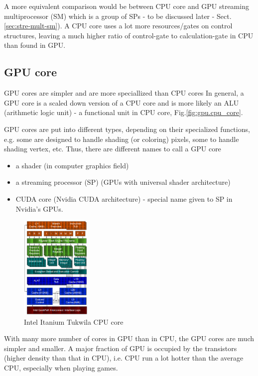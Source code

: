 A more equivalent comparison would be between CPU core and GPU streaming
multiprocessor (SM) which is a group of SPs - to be discussed later -
Sect.\ref{sec:stre-mult-sm}). A CPU core uses a lot more resources/gates on
control structures, leaving a much higher ratio of control-gate to
calculation-gate in CPU than found in GPU.

\subsection{GPU core}

GPU cores are simpler and are more speciallized than CPU cores
In general, a GPU core is a scaled down version of a CPU core and is more likely
an ALU (arithmetic logic unit) - a functional unit in CPU core,
Fig.\ref{fig:gpu.cpu_core}. 

GPU cores are put into different types, depending on their specialized
functions, e.g. some are designed to handle shading (or coloring) pixels, some
to handle shading vertex, etc. Thus, there are different names to call a GPU
core
\begin{itemize}
  \item a shader (in computer graphics field) 
  
  \item a streaming processor (SP) (GPUs with universal shader architecture)
  
  \item CUDA core (Nvidia CUDA architecture) - special name given to SP in Nvidia's GPUs.
\end{itemize}

\begin{figure}[hbt]
  \centerline{\includegraphics[height=5cm,
    angle=0]{./images/Intel_Itanium_Tukwila_core.eps}}
  \caption{Intel Itanium Tukwila CPU core}
  \label{fig:Intel_Itanium_Tukwila_core}
\end{figure}

With many more number of cores in GPU than in CPU, the GPU cores are much
simpler and smaller. A major fraction of GPU is occupied by the transistors
(higher density than that in CPU), i.e. CPU run a lot hotter than the average
CPU, especially when playing games.


